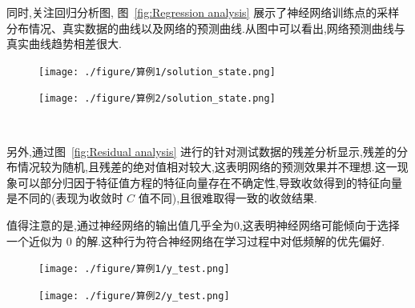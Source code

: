 \documentclass{Sichuan Normal University}
\begin{document}
    同时,关注回归分析图, 图~\ref{fig:Regression analysis} 展示了神经网络训练点的采样分布情况、真实数据的曲线以及网络的预测曲线.从图中可以看出,网络预测曲线与真实曲线趋势相差很大.
\begin{figure}[H]
    \centering
    \begin{minipage}[c]{0.48\textwidth}
    \centering
    \texttt{[image: ./figure/算例1/solution\_state.png]}
    \end{minipage}
    \hspace{0.02\textwidth}
    \begin{minipage}[c]{0.48\textwidth}
    \centering
    \texttt{[image: ./figure/算例2/solution\_state.png]}
    \end{minipage}\\[3mm]
    \begin{minipage}[t]{0.48\textwidth}
    \centering
    \label{fig:Regression analysis}
    \end{minipage}
    \hspace{0.02\textwidth}
    \begin{minipage}[t]{0.48\textwidth}
    \centering
    \label{fig:Regression analysis2}
    \end{minipage}
    \end{figure}
    另外,通过图~\ref{fig:Residual analysis} 进行的针对测试数据的残差分析显示,残差的分布情况较为随机,且残差的绝对值相对较大,这表明网络的预测效果并不理想.这一现象可以部分归因于特征值方程的特征向量存在不确定性,导致收敛得到的特征向量是不同的(表现为收敛时 $C$ 值不同),且很难取得一致的收敛结果.

    值得注意的是,通过神经网络的输出值几乎全为$0$,这表明神经网络可能倾向于选择一个近似为 $0$ 的解.这种行为符合神经网络在学习过程中对低频解的优先偏好.
\begin{figure}[H]
    \centering
    \begin{minipage}[c]{0.48\textwidth}
    \centering
    \texttt{[image: ./figure/算例1/y\_test.png]}
    \end{minipage}
    \hspace{0.02\textwidth}
    \begin{minipage}[c]{0.48\textwidth}
    \centering
    \texttt{[image: ./figure/算例2/y\_test.png]}
    \end{minipage}\\[3mm]
    \begin{minipage}[t]{0.48\textwidth}
    \centering
    \label{fig:Residual analysis}
    \end{minipage}
    \hspace{0.02\textwidth}
    \begin{minipage}[t]{0.48\textwidth}
    \centering
    \label{fig:Residual analysis2}
    \end{minipage}
    \end{figure}
\end{document}
